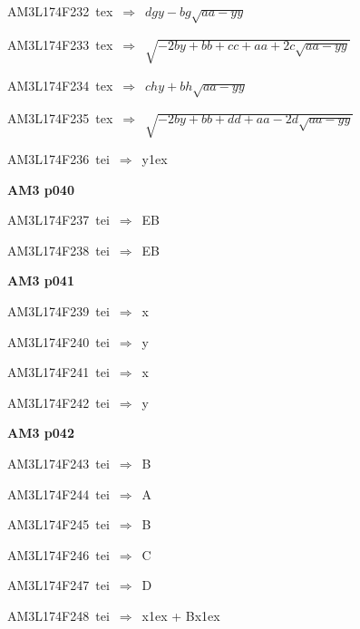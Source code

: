 {\sixrm AM3L174F232\ {\sixit tex}\ }$\Rightarrow$\ $dgy - bg\sqrt{aa - yy}$\par\smallskip
{\sixrm AM3L174F233\ {\sixit tex}\ }$\Rightarrow$\ $\sqrt{ - 2by + bb + cc + aa + 2c\sqrt{aa - yy}}$\par\smallskip
{\sixrm AM3L174F234\ {\sixit tex}\ }$\Rightarrow$\ $chy + bh\sqrt{aa - yy}$\par\smallskip
{\sixrm AM3L174F235\ {\sixit tex}\ }$\Rightarrow$\ $\sqrt{ - 2by + bb + dd + aa - 2d\sqrt{aa - yy}}$\par\smallskip
{\sixrm AM3L174F236\ {\sixit tei}\ }$\Rightarrow$\ {\tenit y}\raise1ex\hbox{}\par\smallskip

\par\vfill\eject
{\bf\hfill AM3 p040\hfill\hbox{}}\par\bigskip
{\sixrm AM3L174F237\ {\sixit tei}\ }$\Rightarrow$\ EB\par\smallskip
{\sixrm AM3L174F238\ {\sixit tei}\ }$\Rightarrow$\ EB\par\smallskip

\par\vfill\eject
{\bf\hfill AM3 p041\hfill\hbox{}}\par\bigskip
{\sixrm AM3L174F239\ {\sixit tei}\ }$\Rightarrow$\ {\tenit x}\par\smallskip
{\sixrm AM3L174F240\ {\sixit tei}\ }$\Rightarrow$\ {\tenit y}\par\smallskip
{\sixrm AM3L174F241\ {\sixit tei}\ }$\Rightarrow$\ {\tenit x}\par\smallskip
{\sixrm AM3L174F242\ {\sixit tei}\ }$\Rightarrow$\ {\tenit y}\par\smallskip

\par\vfill\eject
{\bf\hfill AM3 p042\hfill\hbox{}}\par\bigskip
{\sixrm AM3L174F243\ {\sixit tei}\ }$\Rightarrow$\ {\tenit B}\par\smallskip
{\sixrm AM3L174F244\ {\sixit tei}\ }$\Rightarrow$\ A\par\smallskip
{\sixrm AM3L174F245\ {\sixit tei}\ }$\Rightarrow$\ B\par\smallskip
{\sixrm AM3L174F246\ {\sixit tei}\ }$\Rightarrow$\ C\par\smallskip
{\sixrm AM3L174F247\ {\sixit tei}\ }$\Rightarrow$\ D\par\smallskip
{\sixrm AM3L174F248\ {\sixit tei}\ }$\Rightarrow$\ {\tenit x}\raise1ex\hbox{} + {\tenit Bx}\raise1ex\hbox{}\par\smallskip

